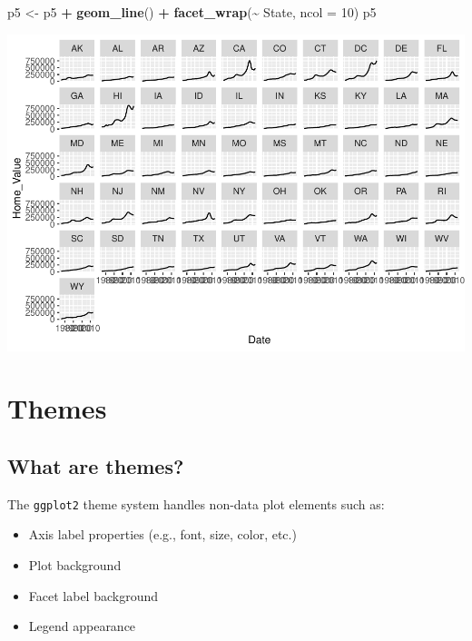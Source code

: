 \documentclass[
]{book}
\newenvironment{Shaded}{\begin{snugshade}}{\end{snugshade}}
\newcommand{\DataTypeTok}[1]{\textcolor[rgb]{0.13,0.29,0.53}{#1}}
\newcommand{\DecValTok}[1]{\textcolor[rgb]{0.00,0.00,0.81}{#1}}
\newcommand{\KeywordTok}[1]{\textcolor[rgb]{0.13,0.29,0.53}{\textbf{#1}}}
\newcommand{\NormalTok}[1]{#1}
\newcommand{\OperatorTok}[1]{\textcolor[rgb]{0.81,0.36,0.00}{\textbf{#1}}}
\newcommand{\StringTok}[1]{\textcolor[rgb]{0.31,0.60,0.02}{#1}}
\providecommand{\tightlist}{%
  \setlength{\itemsep}{0pt}\setlength{\parskip}{0pt}}
\begin{document}
\begin{Shaded}
\begin{Highlighting}[]
\NormalTok{p5 \textless{}{-}}\StringTok{ }\NormalTok{p5 }\OperatorTok{+}\StringTok{ }\KeywordTok{geom\_line}\NormalTok{() }\OperatorTok{+}
\StringTok{   }\KeywordTok{facet\_wrap}\NormalTok{(}\OperatorTok{\textasciitilde{}}\StringTok{ }\NormalTok{State, }\DataTypeTok{ncol =} \DecValTok{10}\NormalTok{)}
\NormalTok{p5}
\end{Highlighting}
\end{Shaded}

\includegraphics{R/Rgraphics/figures/unnamed-chunk-193-1.pdf}

\hypertarget{themes}{%
\section{Themes}\label{themes}}

\hypertarget{what-are-themes}{%
\subsection{What are themes?}\label{what-are-themes}}

The \texttt{ggplot2} theme system handles non-data plot elements such as:

\begin{itemize}
\tightlist
\item
  Axis label properties (e.g., font, size, color, etc.)
\item
  Plot background
\item
  Facet label background
\item
  Legend appearance
\end{itemize}
\end{document}
